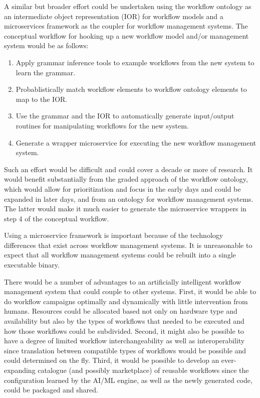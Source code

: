 A similar but broader effort could be undertaken using the workflow ontology as
an intermediate object representation (IOR) for workflow models and a
microservices framework as the coupler for workflow management systems. The
conceptual workflow for hooking up a new workflow model and/or management system
would be as follows:
\begin{enumerate}
  \item Apply grammar inference tools to example workflows from the new system
  to learn the grammar.
  \item Probablistically match workflow elements to workflow ontology elements
  to map to the IOR.
  \item Use the grammar and the IOR to automatically generate input/output
  routines for manipulating workflows for the new system. 
  \item Generate a wrapper microservice for executing the new workflow
  management system.
\end{enumerate}

Such an effort would be difficult and could cover a decade or more of research.
It would benefit substantially from the graded approach of the workflow
ontology, which would allow for prioritization and focus in the early days and
could be expanded in later days, and from an ontology for workflow management
systems. The latter would make it much easier to generate the microservice
wrappers in step 4 of the conceptual workflow.

Using a microservice framework is important because of the technology
differences that exist across workflow management systems. It is unreasonable to
expect that all workflow management systems could be rebuilt into a single
executable binary.

There would be a number of advantages to an artificially intelligent workflow
management system that could couple to other systems. First, it would be able to
do workflow campaigns optimally and dynamically with little intervention from
humans. Resources could be allocated based not only on hardware type and
availability but also by the types of workflows that needed to be executed and
how those workflows could be subdivided. Second, it might also be possible to have
a degree of limited workflow interchangeability as well as interoperability
since translation between compatible types of workflows would be possible and
could determined on the fly. Third, it would be possible to develop an
ever-expanding catalogue (and possibly marketplace) of reusable workflows since
the configuration learned by the AI/ML engine, as well as the newly generated
code, could be packaged and shared.

